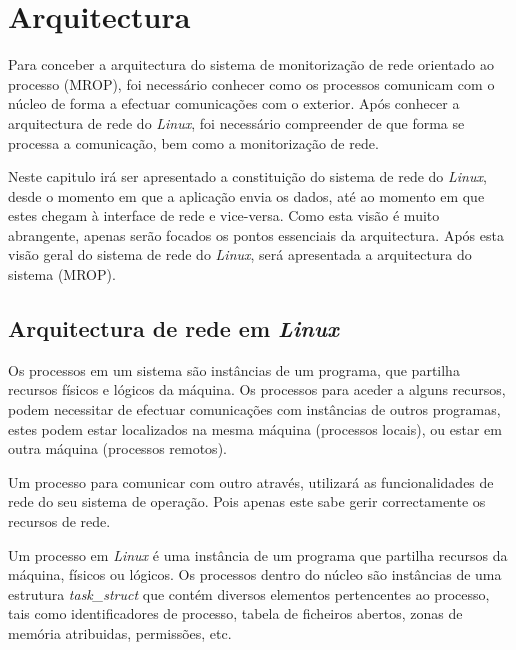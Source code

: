 \chapter{Arquitectura}
\label{cap:Estrutura}

Para conceber a arquitectura do sistema de monitorização de rede orientado ao processo (MROP), foi necessário conhecer como os processos comunicam com o núcleo de forma a efectuar comunicações com o exterior.
Após conhecer a arquitectura de rede do \textit{Linux}, foi necessário compreender de que forma se processa a comunicação, bem como a monitorização de rede.

Neste capitulo irá ser apresentado a constituição do sistema de rede do \textit{Linux}, desde o momento em que a aplicação envia os dados, até ao momento em que estes chegam à interface de rede e vice-versa.
Como esta visão é muito abrangente, apenas serão focados os pontos essenciais da arquitectura.
Após esta visão geral do sistema de rede do \textit{Linux}, será apresentada a arquitectura do sistema (MROP).


\section{Arquitectura de rede em \textit{Linux}}
\label{sub:network}

Os processos em um sistema são instâncias de um programa, que partilha recursos físicos e lógicos da máquina.
Os processos para aceder a alguns recursos, podem necessitar de efectuar comunicações com instâncias de outros programas, estes podem estar localizados na mesma máquina (processos locais), ou estar em outra máquina (processos remotos).

Um processo para comunicar com outro através, utilizará as funcionalidades de rede do seu sistema de operação.
Pois apenas este sabe gerir correctamente os recursos de rede.

 Um processo em \textit{Linux} é uma instância de um programa que partilha recursos da máquina, físicos ou lógicos.
 Os processos dentro do núcleo são instâncias de uma estrutura \textit{task\_struct} que contém diversos elementos pertencentes ao processo, tais como identificadores de processo, tabela de ficheiros abertos, zonas de memória atribuidas, permissões, etc.
 
